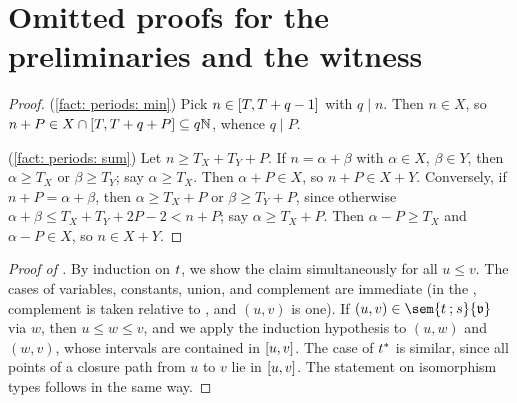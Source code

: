 \section{Omitted proofs for the preliminaries and the witness}\label{section: appendix: witness}

\factPeriods*
\begin{proof}
    (\ref{fact: periods: min})
    Pick $n \in [T, T + q - 1]$ with $q \mid n$. Then $n \in X$, so $n + P \in X \cap [T, T + q + P] \subseteq q \mathbb{N}$, whence $q \mid P$.

    (\ref{fact: periods: sum})
    Let $n \ge T_X + T_Y + P$.
    If $n = \alpha + \beta$ with $\alpha \in X$, $\beta \in Y$, then $\alpha \ge T_X$ or $\beta \ge T_Y$; say $\alpha \ge T_X$.
    Then $\alpha + P \in X$, so $n + P \in X + Y$.
    Conversely, if $n + P = \alpha + \beta$, then $\alpha \ge T_X + P$ or $\beta \ge T_Y + P$, since otherwise $\alpha + \beta \le T_X + T_Y + 2P - 2 < n + P$; say $\alpha \ge T_X + P$.
    Then $\alpha - P \ge T_X$ and $\alpha - P \in X$, so $n \in X + Y$.
\end{proof}

\begin{proof}[Proof of ]
    By induction on $\term$, we show the claim simultaneously for all $u \le v$.
    The cases of variables, constants, union, and complement are immediate (in the , complement is taken relative to , and $(u, v)$ is one).
    If $(u, v) \in \sem{\term[1] \compo \term[2]}{\val}$ via $w$, then $u \le w \le v$, and we apply the induction hypothesis to $(u, w)$ and $(w, v)$, whose intervals are contained in $[u, v]$.
    The case of $\term^{*}$ is similar, since all points of a closure path from $u$ to $v$ lie in $[u, v]$.
    The statement on isomorphism types follows in the same way.
\end{proof}

